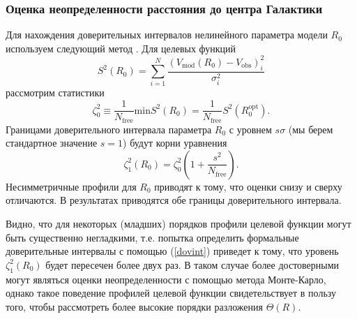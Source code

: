 \documentclass{matmex-diploma-custom}
\begin{document}
\subsubsection{Оценка неопределенности расстояния до центра Галактики} \label{err_r0}
Для нахождения доверительных интервалов нелинейного параметра модели $R_0$ используем следующий метод \cite{Agladze}. Для целевых функций
\begin{equation}
        S^2(R_0) = \sum_{i=1}^N \frac{\left(V_{\mathrm{mod}}(R_0) - V_{\mathrm{obs}} \right)^2_i}{\sigma_i^2}
\end{equation}
рассмотрим статистики 
\begin{equation}
        \zeta^2_0 \equiv \frac{1}{N_{\mathrm{free}}} \mathrm{min} S^2(R_0) = \frac{1}{N_{\mathrm{free}}} S^2(R_0^{\mathrm{opt}}).
\end{equation}
Границами доверительного интервала параметра $R_0$ с уровнем $s \sigma$ (мы берем стандартное значение $s = 1$) будут корни уравнения
\begin{equation} \label{dovint}
        \zeta^2_1(R_0) = \zeta_0^2 \left( 1 + \frac{s^2}{N_{\mathrm{free}}} \right).
\end{equation}
Несимметричные профили для $R_0$ приводят к тому, что оценки снизу и сверху отличаются. В результатах приводятся обе границы доверительного интервала. 

Видно, что для некоторых (младших) порядков профили целевой функции могут быть существенно негладкими, т.е. попытка определить формальные доверительные интервалы с помощью (\ref{dovint}) приведет к тому, что уровень $\zeta_1^2(R_0)$ будет пересечен более двух раз. В таком случае более достоверными могут являться оценки неопределенности с помощью метода Монте-Карло, однако такое поведение профилей целевой функции свидетельствует в пользу того, чтобы рассмотреть более высокие порядки разложения $\Theta(R)$. 

\pagebreak
\end{document}
